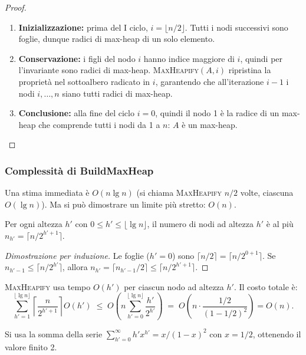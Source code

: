\begin{proof}
	\begin{enumerate}
		\item \textbf{Inizializzazione:} prima del I ciclo, $i = \lfloor n/2
		\rfloor$. Tutti i nodi successivi sono foglie, dunque radici di
		max-heap di un solo elemento. \checkmark
		\item \textbf{Conservazione:} i figli del nodo $i$ hanno indice
		maggiore di $i$, quindi per l'invariante sono radici di
		max-heap. \textsc{MaxHeapify}$(A, i)$ ripristina la proprietà
		nel sottoalbero radicato in $i$, garantendo che all'iterazione
		$i-1$ i nodi $i, \ldots, n$ siano tutti radici di max-heap.
		\checkmark
		\item \textbf{Conclusione:} alla fine del ciclo $i = 0$, quindi il
		nodo 1 è la radice di un max-heap che comprende tutti i nodi da
		1 a $n$: $A$ è un max-heap. \checkmark
	\end{enumerate}
\end{proof}

\subsubsection{Complessità di BuildMaxHeap}

\begin{softnote}
	Una stima immediata è $O(n \lg n)$ (si chiama \textsc{MaxHeapify}
	$n/2$ volte, ciascuna $O(\lg n)$). Ma si può dimostrare un limite
	più stretto: $O(n)$.
\end{softnote}

Per ogni altezza $h'$ con $0 \le h' \le \lfloor \lg n \rfloor$,
il numero di nodi ad altezza $h'$ è al più
$n_{h'} = \lceil n / 2^{h'+1} \rceil$.

\begin{proof}[Dimostrazione per induzione]
	Le foglie ($h'=0$) sono $\lceil n/2 \rceil = \lceil n/2^{0+1} \rceil$.
	Se $n_{h'-1} \le \lceil n/2^{h'} \rceil$, allora
	$n_{h'} = \lceil n_{h'-1}/2 \rceil \le \lceil n/2^{h'+1} \rceil$.
\end{proof}

\textsc{MaxHeapify} usa tempo $O(h')$ per ciascun nodo ad altezza
$h'$. Il costo totale è:
\[
\sum_{h'=1}^{\lfloor \lg n \rfloor}
\left\lceil \frac{n}{2^{h'+1}} \right\rceil O(h')
\;\le\;
O\!\left(n \sum_{h'=0}^{\lfloor \lg n \rfloor} \frac{h'}{2^{h'}}
\right)
\;=\;
O\!\left(n \cdot \frac{1/2}{(1-1/2)^2}\right)
= O(n).
\]

\begin{nota}
	Si usa la somma della serie $\sum_{h'=0}^{\infty} h' x^{h'} =
	x/(1-x)^2$ con $x = 1/2$, ottenendo il valore finito 2.
\end{nota}


